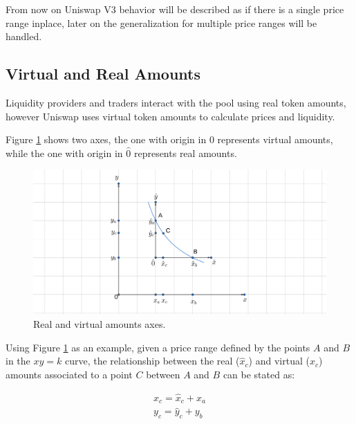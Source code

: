 \documentclass{article}
\begin{document}
From now on Uniswap V3 behavior will be described as if there is a single price range inplace, later on the generalization for multiple price ranges will be handled.

\subsection{Virtual and Real Amounts}

Liquidity providers and traders interact with the pool using real token amounts, however Uniswap uses virtual token amounts to calculate prices and liquidity.

Figure \ref{figure:uniswap_v3} shows two axes, the one with origin in $0$ represents virtual amounts, while the one with origin in $\hat{0}$ represents real amounts.

\begin{figure}[h]
\label{figure:uniswap_v3}
\includegraphics[scale=1.6]{uniswap_v3}
\centering
\caption{Real and virtual amounts axes.}
\end{figure}

Using Figure \ref{figure:uniswap_v3} as an example, given a price range defined by the points $A$ and $B$ in the $xy=k$ curve, the relationship between the real ($\hat{x}_c$) and virtual ($x_c$) amounts associated to a point $C$ between $A$ and $B$ can be stated as:

\begin{equation}
    \label{equation:virtual_amounts}
    \begin{split}
        x_c=\hat{x}_c + x_a \\
        y_c=\hat{y}_c + y_b \\
    \end{split}
\end{equation}
\end{document}
